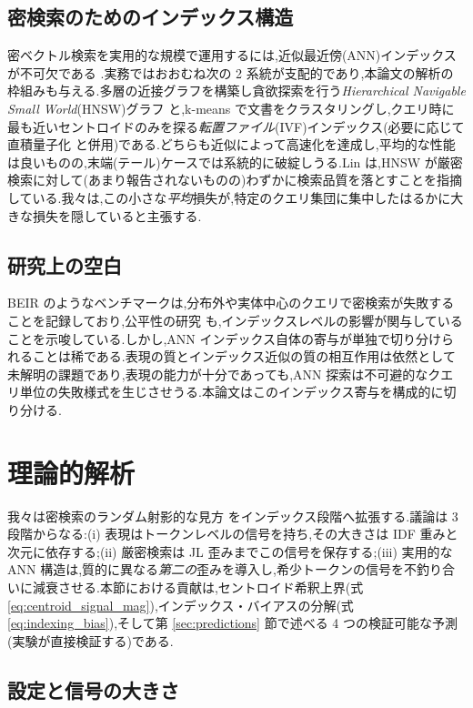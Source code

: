 \documentclass[conference]{IEEEtran}
\begin{document}
\subsection{密検索のためのインデックス構造}
密ベクトル検索を実用的な規模で運用するには,近似最近傍(ANN)インデックスが不可欠である \cite{johnson2019billion}.実務ではおおむね次の 2 系統が支配的であり,本論文の解析の枠組みも与える.多層の近接グラフを構築し貪欲探索を行う\emph{Hierarchical Navigable Small World}(HNSW)グラフ \cite{malkov2019efficient} と,k-means で文書をクラスタリングし,クエリ時に最も近いセントロイドのみを探る\emph{転置ファイル}(IVF)インデックス(必要に応じて直積量子化 \cite{jegou2010product} と併用)である.どちらも近似によって高速化を達成し,平均的な性能は良いものの,末端(テール)ケースでは系統的に破綻しうる.Lin \cite{lin2024dense} は,HNSW が厳密検索に対して(あまり報告されないものの)わずかに検索品質を落とすことを指摘している.我々は,この小さな\emph{平均}損失が,特定のクエリ集団に集中したはるかに大きな損失を隠していると主張する.

\subsection{研究上の空白}
BEIR \cite{thakur2021beir} のようなベンチマークは,分布外や実体中心のクエリで密検索が失敗することを記録しており,公平性の研究 \cite{zhan2021understanding} も,インデックスレベルの影響が関与していることを示唆している.しかし,ANN インデックス自体の寄与が単独で切り分けられることは稀である.表現の質とインデックス近似の質の相互作用は依然として未解明の課題であり,表現の能力が十分であっても,ANN 探索は不可避的なクエリ単位の失敗様式を生じさせうる.本論文はこのインデックス寄与を構成的に切り分ける.

\section{理論的解析}\label{sec:theory}

我々は密検索のランダム射影的な見方 \cite{tay2020sparse} をインデックス段階へ拡張する.議論は 3 段階からなる:(i) 表現はトークンレベルの信号を持ち,その大きさは IDF 重みと次元に依存する;(ii) 厳密検索は JL 歪みまでこの信号を保存する;(iii) 実用的な ANN 構造は,質的に異なる\emph{第二の}歪みを導入し,希少トークンの信号を不釣り合いに減衰させる.本節における貢献は,セントロイド希釈上界(式 \eqref{eq:centroid_signal_mag}),インデックス・バイアスの分解(式 \eqref{eq:indexing_bias}),そして第 \ref{sec:predictions} 節で述べる 4 つの検証可能な予測(実験が直接検証する)である.

\subsection{設定と信号の大きさ}\label{sec:theory-setup}
\end{document}

